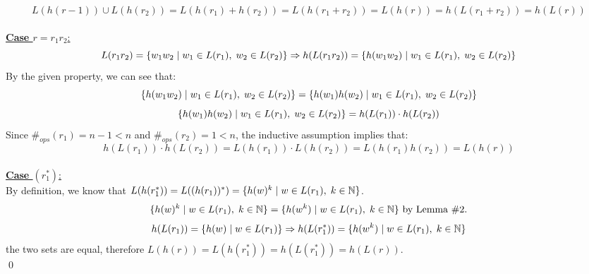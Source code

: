 \documentclass[11pt]{article}
\begin{document}
\[L(h(r-1))\cup L(h(r_2))=L(h(r_1)+h(r_2))=L(h(r_1+r_2))=L(h(r))=h(L(r_1+r_2))=h(L(r))\]
\\
\underline{\textbf{Case $r=r_1r_2$}:}
\[L(r_1r_2)=\{w_1w_2\hspace{1mm}|\hspace{1mm}w_1\in L(r_1),\hspace{1mm}w_2\in L(r_2)\}\Rightarrow h(L(r_1r_2))=\{h(w_1w_2)\hspace{1mm}|\hspace{1mm}w_1\in L(r_1),\hspace{1mm}w_2\in L(r_2)\}\]
By the given property, we can see that:
\[\{h(w_1w_2)\hspace{1mm}|\hspace{1mm}w_1\in L(r_1),\hspace{1mm}w_2\in L(r_2)\}=\{h(w_1)h(w_2)\hspace{1mm}|\hspace{1mm}w_1\in L(r_1),\hspace{1mm}w_2\in L(r_2)\}\]
\[\{h(w_1)h(w_2)\hspace{1mm}|\hspace{1mm}w_1\in L(r_1),\hspace{1mm}w_2\in L(r_2)\}=h(L(r_1))\cdot h(L(r_2))\]
Since $\#_{ops}(r_1)=n-1<n$ and $\#_{ops}(r_2)=1<n$, the inductive assumption implies that:
\[h(L(r_1))\cdot h(L(r_2))=L(h(r_1))\cdot L(h(r_2))=L(h(r_1)h(r_2))=L(h(r))\]
\\
\underline{\textbf{Case $(r_1^*)$}:} \\
By definition, we know that $L(h(r_1^*))=L((h(r_1))^*)=\{h(w)^k\hspace{1mm}|\hspace{1mm}w\in L(r_1),\hspace{1mm}k\in\mathbb{N}\}$.
\[\{h(w)^k\hspace{1mm}|\hspace{1mm}w\in L(r_1),\hspace{1mm}k\in\mathbb{N}\}=\{h(w^k)\hspace{1mm}|\hspace{1mm}w\in L(r_1),\hspace{1mm}k\in\mathbb{N}\}\text{ by Lemma }\#2.\]
\[h(L(r_1))=\{h(w)\hspace{1mm}|\hspace{1mm}w\in L(r_1)\}\Rightarrow h(L(r_1^*))=\{h(w^k)\hspace{1mm}|\hspace{1mm}w\in L(r_1),\hspace{1mm}k\in\mathbb{N}\}\]
the two sets are equal, therefore $L(h(r))=L(h(r_1^*))=h(L(r_1^*))=h(L(r))$. \\ \qed
\end{document}
